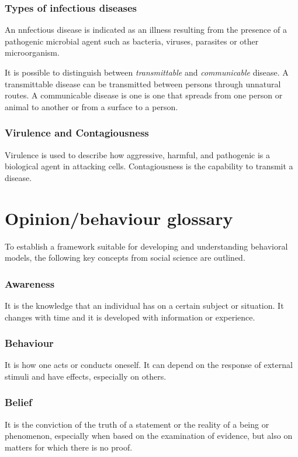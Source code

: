 \subsubsection{Types of infectious diseases}An nnfectious disease is indicated as an illness resulting from the presence of a pathogenic microbial agent such as bacteria, viruses, parasites or other microorganism.

It is possible to distinguish between \textit{transmittable} and \textit{communicable} disease. A transmittable disease can be transmitted between persons through unnatural routes. A communicable disease is one is one that spreads from one person or animal to another or from a surface to a person.  


\subsubsection{Virulence and Contagiousness}  Virulence is used to describe how aggressive, harmful, and pathogenic is a biological agent in attacking cells. Contagiousness is the capability to transmit a disease. 


\section{Opinion/behaviour glossary}
To establish a framework suitable for developing and understanding behavioral models, the following key concepts from social science are outlined.
\subsubsection{Awareness} It is the knowledge that an individual has on a certain subject or situation. It changes with time and it is developed with information or experience.  

\subsubsection{Behaviour} It is how one acts or conducts oneself. It can depend on the response of external stimuli and have effects, especially on others.


\subsubsection{Belief} It is the conviction of the truth of a statement or the reality of a being or phenomenon, especially when based on the examination of evidence, but also on matters for which there is no proof.


